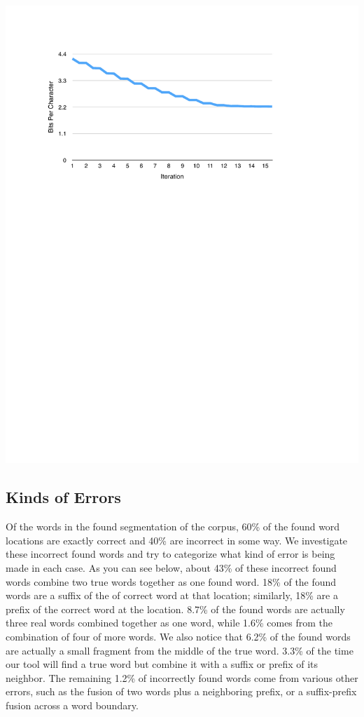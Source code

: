 \documentclass[11pt, oneside, fleqn]{article}
\begin{document}
  \includegraphics{./figure/bit_of_char_per_iteration.pdf}

  \subsection{Kinds of Errors}

	Of the words in the found segmentation of the corpus, 60\% of the found word locations are exactly correct and 40\% are incorrect in some way. We investigate these incorrect found words and try to categorize what kind of error is being made in each case. As you can see below, about 43\% of these incorrect found words combine two true words together as one found word. 18\% of the found words are a suffix of the of correct word at that location; similarly, 18\% are a prefix of the correct word at the location. 8.7\% of the found words are actually three real words combined together as one word, while 1.6\% comes from the combination of four of more words. We also notice that 6.2\% of the found words are actually a small fragment from the middle of the true word. 3.3\% of the time our tool will find a true word but combine it with a suffix or prefix of its neighbor. The remaining 1.2\% of incorrectly found words come from various other errors, such as the fusion of two words plus a neighboring prefix, or a suffix-prefix fusion across a word boundary.
\end{document}
